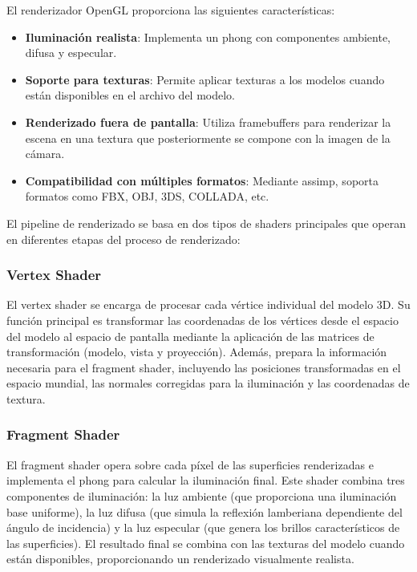 El renderizador OpenGL proporciona las siguientes características:

\begin{itemize}
    \item \textbf{Iluminación realista}: Implementa un \gls{phong} con componentes ambiente, difusa y especular.
    \item \textbf{Soporte para texturas}: Permite aplicar texturas a los modelos cuando están disponibles en el archivo del modelo.
    \item \textbf{Renderizado fuera de pantalla}: Utiliza framebuffers para renderizar la escena en una textura que posteriormente se compone con la imagen de la cámara.
    \item \textbf{Compatibilidad con múltiples formatos}: Mediante \acrshort{assimp}, soporta formatos como FBX, OBJ, 3DS, COLLADA, etc.
\end{itemize}

El pipeline de renderizado se basa en dos tipos de shaders principales que operan en diferentes etapas del proceso de renderizado:

\subsubsection{Vertex Shader}
El vertex shader se encarga de procesar cada vértice individual del modelo 3D. Su función principal es transformar las coordenadas de los vértices desde el espacio del modelo al espacio de pantalla mediante la aplicación de las matrices de transformación (modelo, vista y proyección). Además, prepara la información necesaria para el fragment shader, incluyendo las posiciones transformadas en el espacio mundial, las normales corregidas para la iluminación y las coordenadas de textura.

\subsubsection{Fragment Shader}
El fragment shader opera sobre cada píxel de las superficies renderizadas e implementa el \gls{phong} para calcular la iluminación final. Este shader combina tres componentes de iluminación: la luz ambiente (que proporciona una iluminación base uniforme), la luz difusa (que simula la reflexión lamberiana dependiente del ángulo de incidencia) y la luz especular (que genera los brillos característicos de las superficies). El resultado final se combina con las texturas del modelo cuando están disponibles, proporcionando un renderizado visualmente realista.

